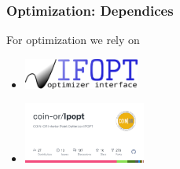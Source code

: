 \begin{frame}[t]
	\frametitle{Optimization: Dependices}

	For optimization we rely on
	\begin{itemize}
		\item \includegraphics[height=1cm]{images/ifopt.png}
		\item \includegraphics[height=2cm]{images/Ipopt.png}
	\end{itemize}
\end{frame}


